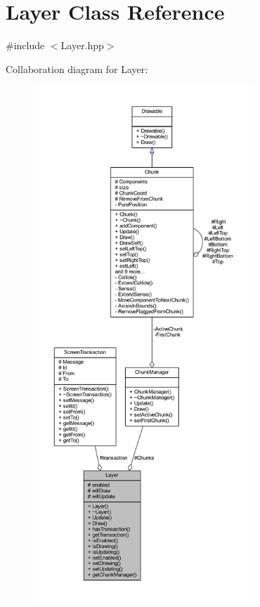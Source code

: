 \hypertarget{class_layer}{\section{Layer Class Reference}
\label{class_layer}
}


{\ttfamily \#include $<$Layer.\-hpp$>$}



Collaboration diagram for Layer\-:
\nopagebreak
\begin{figure}[H]
\begin{center}
\leavevmode
\includegraphics[height=550pt]{class_layer__coll__graph}
\end{center}
\end{figure}
